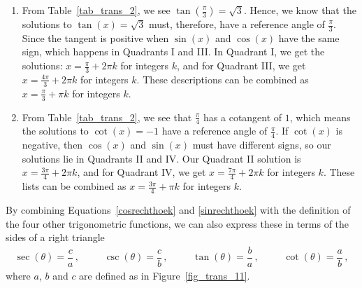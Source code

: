 \begin{example}
\begin{enumerate}
\item From Table~\ref{tab_trans_2}, we see  $\tan\left(\frac{\pi}{3}\right) = \sqrt{3}$. Hence, we  know  that the solutions to $\tan(x) = \sqrt{3}$ must, therefore, have a reference angle of $\frac{\pi}{3}$. Since the tangent is positive when $\sin(x)$ and $\cos(x)$ have the same sign, which happens in Quadrants I and III.  In Quadrant I, we get the solutions: $x = \frac{\pi}{3} + 2\pi k$ for integers $k$, and for Quadrant III, we get $x = \frac{4\pi}{3} + 2\pi k$ for integers $k$. These descriptions can be combined as $x = \frac{\pi}{3} + \pi k$ for integers $k$. 
  

\item  From Table~\ref{tab_trans_2}, we see that $\frac{\pi}{4}$ has a cotangent of $1$, which means the solutions to $\cot(x) = -1$ have a reference angle of $\frac{\pi}{4}$. If $\cot(x)$ is negative, then $\cos(x)$ and $\sin(x)$ must have different signs, so our solutions lie in Quadrants II and IV.  Our Quadrant II solution is $x = \frac{3\pi}{4} + 2\pi k$, and for Quadrant IV, we get $x = \frac{7\pi}{4} + 2\pi k$ for integers $k$.  These lists can be combined as  $x = \frac{3\pi}{4} + \pi k$ for integers $k$.
\end{enumerate}



\end{example}
\fi


 By combining Equations~\eqref{cosrechthoek} and \eqref{sinrechthoek} with the definition of the four other trigonometric functions, we can also express these in terms of the sides of a right triangle
$$
\begin{array}{llll}  \sec(\theta) = \dfrac{c}{a}\,, \;\;\;\;\;\; & \csc(\theta) = \dfrac{c}{b}\,, \;\;\;\;\;\; & \tan(\theta) = \dfrac{b}{a}\,, \;\;\;\;\;\; & \cot(\theta) = \dfrac{a}{b}\,,  \end{array}
$$
where $a$, $b$ and $c$ are defined as in Figure~\ref{fig_trans_11}. 

